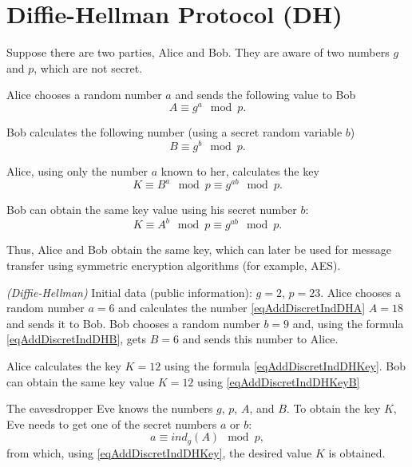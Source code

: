 \section{Diffie-Hellman Protocol (DH)}
\label{sec:add:dm:dh}
Suppose there are two parties, Alice and Bob. They are aware of two numbers
$g$ and $p$, which are not secret.

Alice chooses a random number $a$ and sends the following value to Bob
\begin{equation}
A \equiv g^a \mod{p}.
\label{eqAddDiscretIndDHA}
\end{equation}

Bob calculates the following number (using a secret random variable
$b$)
\begin{equation}
B \equiv g^b \mod{p}.
\label{eqAddDiscretIndDHB}
\end{equation}

Alice, using only the number $a$ known to her, calculates the key
\begin{equation}
K \equiv B^a\mod{p} \equiv g^{ab} \mod{p}.
\label{eqAddDiscretIndDHKey}
\end{equation}

Bob can obtain the same key value using his
secret number $b$:
\begin{equation}
K \equiv A^b\mod{p} \equiv g^{ab} \mod{p}.
\label{eqAddDiscretIndDHKeyB}
\end{equation}

Thus, Alice and Bob obtain the same key, which can later be used for message transfer using
symmetric encryption algorithms (for example, AES). 

\begin{example}
\emph{(Diffie-Hellman)}
Initial data (public information): $g = 2$, $p = 23$. Alice
chooses a random number $a = 6$ and calculates the number
\eqref{eqAddDiscretIndDHA} 
$A = 18$ and sends it to Bob.
Bob chooses a random number $b=9$ and, using the formula 
\eqref{eqAddDiscretIndDHB}, gets
$B = 6$ and sends this number to Alice.

Alice calculates the key 
$K = 12$ using the formula \eqref{eqAddDiscretIndDHKey}. Bob can obtain
the same key value 
$K = 12$ using \eqref{eqAddDiscretIndDHKeyB}
\nonumber
\end{example}

The eavesdropper Eve knows the numbers $g$, $p$, $A$, and $B$. To obtain
the key $K$, Eve needs to get one of the secret numbers $a$ or $b$:
\begin{equation}
a \equiv ind_g\left( A \right) \mod{p},
\nonumber
\end{equation}
from which, using \eqref{eqAddDiscretIndDHKey}, the desired
value $K$ is obtained.